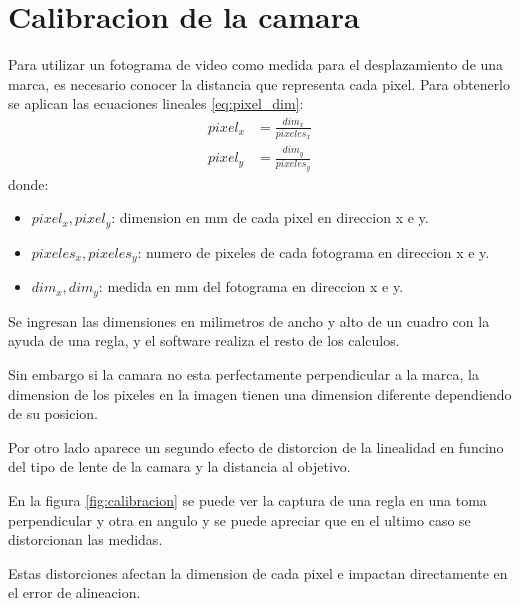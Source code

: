 \section{Calibracion de la camara}
   Para utilizar un fotograma de video como medida para el desplazamiento de una marca, es necesario conocer la distancia que representa cada pixel.
   Para obtenerlo se aplican las ecuaciones lineales \ref{eq:pixel_dim}:
   \begin{equation}
      \begin{aligned}
         pixel_x&=\frac{dim_x}{pixeles_x} \\
         pixel_y&=\frac{dim_y}{pixeles_y}
      \end{aligned}
      \label{eq:pixel_dim}
   \end{equation}
donde:
\begin{itemize}
   \item{$pixel_x,pixel_y$: dimension en mm de cada pixel en direccion x e y.}
   \item{$pixeles_x, pixeles_y$: numero de pixeles de cada fotograma en direccion x e y.}
   \item{$dim_x, dim_y$: medida en mm del fotograma en direccion x e y.}
\end{itemize}

Se ingresan las dimensiones en milimetros de ancho y alto de un cuadro con la ayuda de una regla, y el software realiza el resto de los calculos.\par

Sin embargo si la camara no esta perfectamente perpendicular a la marca, la dimension de los pixeles en la imagen tienen una dimension diferente dependiendo de su posicion.  \par
Por otro lado aparece un segundo efecto de distorcion de la linealidad en funcino del tipo de lente de la camara y la distancia al objetivo.\par

En la figura \ref{fig:calibracion} se puede ver la captura de una regla en una toma perpendicular y otra en angulo y se puede apreciar que en el ultimo caso se distorcionan las medidas. \par

Estas distorciones afectan la dimension de cada pixel e impactan directamente en el error de alineacion.\par

